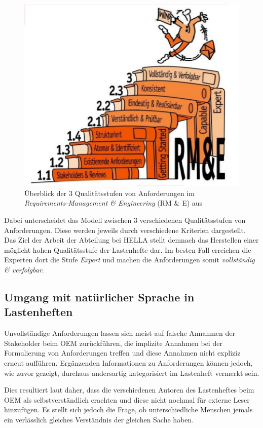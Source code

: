 \documentclass[12pt]{report}
\begin{document}
\begin{figure}[h!]
\begin{center}
\includegraphics[scale=0.5]{Bilder/HOOD-RE.jpg}
\caption{Überblick der 3 Qualitätsstufen von Anforderungen im \textit{Requirements-Management \& Engineering} (RM \& E) aus \cite{hp12}}
\end{center}
\end{figure}

Dabei unterscheidet das Modell zwischen 3 verschiedenen Qualitätsstufen von Anforderungen. Diese werden jeweils durch verschiedene Kriterien dargestellt. Das Ziel der Arbeit der Abteilung bei HELLA stellt demnach das Herstellen einer möglicht hohen Qualitätsstufe der Lastenhefte dar. Im besten Fall erreichen die Experten dort die Stufe \textit{Expert} und machen die Anforderungen somit \textit{vollständig \& verfolgbar}.

\subsection{Umgang mit natürlicher Sprache in Lastenheften}
Unvollständige Anforderungen lassen sich meist auf falsche Annahmen der Stakeholder beim OEM zurückführen, die implizite Annahmen bei der Formulierung von Anforderungen treffen und diese Annahmen nicht expliziz erneut aufführen. Ergänzenden Informationen zu Anforderungen können jedoch, wie zuvor gezeigt, durchaus andersartig kategorisiert im Lastenheft vermerkt sein. 

Dies resultiert laut \cite{pr15} daher, dass die verschiedenen Autoren des Lastenheftes beim OEM als selbstverständlich erachten und diese nicht nochmal für externe Leser hinzufügen. Es stellt sich jedoch die Frage, ob unterschiedliche Menschen jemals ein verlässlich gleiches Verständnis der gleichen Sache haben. 
\end{document}
